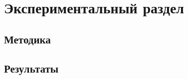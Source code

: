 \chapter{Экспериментальный раздел}
\label{chapter:experiments}

\section{Методика}

\section{Результаты}